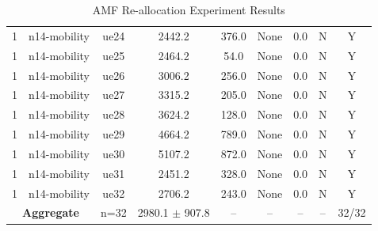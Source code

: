 \begin{table}[ht]
\begin{tabular}{|c|c|c|c|c|c|c|c|c|}
1 & n14-mobility & ue24 & 2442.2 & 376.0 & None & 0.0 & N & Y \\
1 & n14-mobility & ue25 & 2464.2 & 54.0 & None & 0.0 & N & Y \\
1 & n14-mobility & ue26 & 3006.2 & 256.0 & None & 0.0 & N & Y \\
1 & n14-mobility & ue27 & 3315.2 & 205.0 & None & 0.0 & N & Y \\
1 & n14-mobility & ue28 & 3624.2 & 128.0 & None & 0.0 & N & Y \\
1 & n14-mobility & ue29 & 4664.2 & 789.0 & None & 0.0 & N & Y \\
1 & n14-mobility & ue30 & 5107.2 & 872.0 & None & 0.0 & N & Y \\
1 & n14-mobility & ue31 & 2451.2 & 328.0 & None & 0.0 & N & Y \\
1 & n14-mobility & ue32 & 2706.2 & 243.0 & None & 0.0 & N & Y \\
\multicolumn{2}{|c|}{\textbf{Aggregate}} & n=32 & 2980.1 $\pm$ 907.8 & -- & -- & -- & -- & 32/32 \\
\hline
\end{tabular}
\caption{AMF Re-allocation Experiment Results}
\label{tab:amf_realloc}
\end{table}
